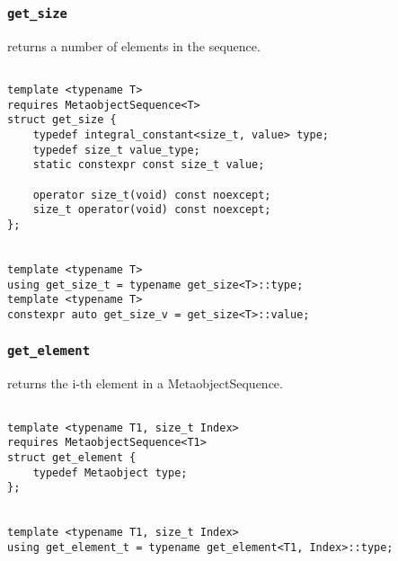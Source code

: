 
\subsubsection{\texttt{get\_size}}

returns a number of elements in the sequence.

\begin{verbatim}

template <typename T>
requires MetaobjectSequence<T>
struct get_size {
	typedef integral_constant<size_t, value> type;
	typedef size_t value_type;
	static constexpr const size_t value;

	operator size_t(void) const noexcept;
	size_t operator(void) const noexcept;
};


template <typename T>
using get_size_t = typename get_size<T>::type;
template <typename T>
constexpr auto get_size_v = get_size<T>::value;

\end{verbatim}

\subsubsection{\texttt{get\_element}}

returns the i-th element in a MetaobjectSequence.

\begin{verbatim}

template <typename T1, size_t Index>
requires MetaobjectSequence<T1>
struct get_element {
	typedef Metaobject type;
};


template <typename T1, size_t Index>
using get_element_t = typename get_element<T1, Index>::type;

\end{verbatim}
